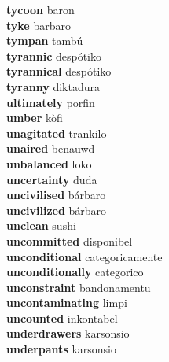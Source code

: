\textbf{tycoon } baron \\
\textbf{tyke } barbaro \\
\textbf{tympan } tambú \\
\textbf{tyrannic } despótiko \\
\textbf{tyrannical } despótiko \\
\textbf{tyranny } diktadura \\
\textbf{ultimately } porfin \\
\textbf{umber } kòfi \\
\textbf{unagitated } trankilo \\
\textbf{unaired } benauwd \\
\textbf{unbalanced } loko \\
\textbf{uncertainty } duda \\
\textbf{uncivilised } bárbaro \\
\textbf{uncivilized } bárbaro \\
\textbf{unclean } sushi \\
\textbf{uncommitted } disponibel \\
\textbf{unconditional } categoricamente \\
\textbf{unconditionally } categorico \\
\textbf{unconstraint } bandonamentu \\
\textbf{uncontaminating } limpi \\
\textbf{uncounted } inkontabel \\
\textbf{underdrawers } karsonsio \\
\textbf{underpants } karsonsio \\
